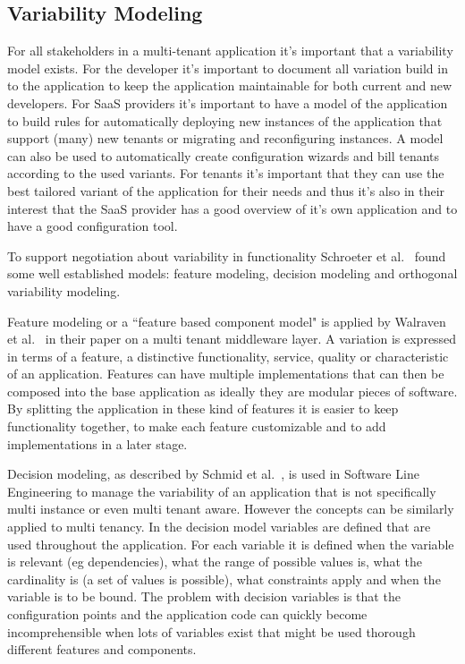
\subsection{Variability Modeling}
For all stakeholders in a multi-tenant application it's important that a variability model exists. For the developer it's important to document all variation build in to the application to keep the application maintainable for both current and new developers. 
For SaaS providers it's important to have a model of the application to build rules for automatically deploying new instances of the application that support (many) new tenants or migrating and reconfiguring instances. 
A model can also be used to automatically create configuration wizards and bill tenants according to the used variants. 
For tenants it's important that they can use the best tailored variant of the application for their needs and thus it's also in their interest that the SaaS provider has a good overview of it's own application and to have a good configuration tool.

To support negotiation about variability in functionality Schroeter et al.~\cite{schroeter2012towards} found some well established models: feature modeling, decision modeling and orthogonal variability modeling.

Feature modeling or a ``feature based component model" is applied by Walraven et al.~\cite{walraven2011middleware} in their paper on a multi tenant middleware layer. A variation is
expressed in terms of a feature, a distinctive functionality, service, quality or characteristic of an 
application. Features can have multiple implementations that can then be composed into the 
base application as ideally they are modular pieces of software. By splitting the application in 
these kind of features it is easier to keep functionality together, to make each feature 
customizable and to add implementations in a later stage.

Decision modeling, as described by Schmid et al.~\cite{schmid2004customizable}, is used in 
Software Line Engineering to manage the variability of an application that is not specifically 
multi instance or even multi tenant aware. However the concepts can be similarly applied to 
multi tenancy. In the decision model variables are defined that are used throughout the 
application. For each variable it is defined when the variable is relevant (eg dependencies), 
what the range of possible values is, what the cardinality is (a set of values is possible), what 
constraints apply and when the variable is to be bound. The problem with decision variables is 
that the configuration points and the application code can quickly become incomprehensible 
when lots of variables exist that might be used thorough different features and components.

